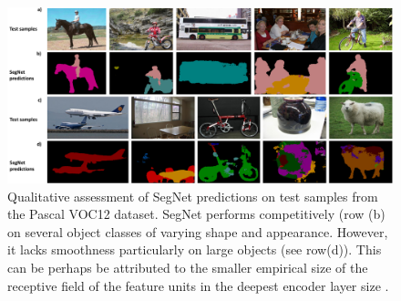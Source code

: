 \begin{figure}[t]
\centering
\includegraphics[width=\textwidth]{segnet/PascalQualy2.pdf}
\caption[Qualitative assessment of SegNet on Pascal VOC12]{Qualitative assessment of SegNet predictions on test samples from the Pascal VOC12 \citep{pascal} dataset. SegNet performs competitively (row (b) on several object classes of varying shape and appearance. However, it lacks smoothness particularly on large objects (see row(d)). This can be perhaps be attributed to the smaller empirical size of the receptive field of the feature units in the deepest encoder layer size \citep{zhou2014object}.}
\label{PascalQualy}
\end{figure}

